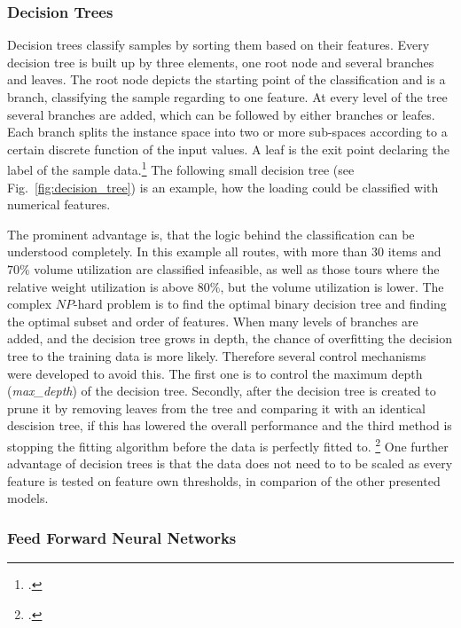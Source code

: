 \subsubsection{Decision Trees}
Decision trees classify samples by sorting them based on their features. Every decision tree
is built up by three elements, one root node and several branches and leaves. The root node
depicts the starting point of the classification and is a branch, classifying the sample
regarding to one feature. At every level of the tree several branches are added, which can be followed
by either branches or leafes. Each branch splits the instance space into two or more sub-spaces
according to a certain discrete function of the input values. A leaf is the exit point declaring
the label of the sample data.\footcite[cf.][p.5-6]{nasteski_overview_2017} The following small decision tree (see Fig.~\ref{fig:decision_tree}) is an example, how the loading could be classified with numerical features.


The  prominent advantage is, that the logic behind the classification can be understood
completely. In this example all routes, with more than 30 items and $70\%$ volume utilization are classified infeasible,
as well as those tours where the relative weight utilization is above $80\%$, but the volume utilization is lower. The complex
$NP$-hard problem is to find the optimal binary decision tree and finding the optimal subset and order of
features.
When many levels of branches are added, and the decision tree grows in depth, the chance of
overfitting the decision tree to the training data is more likely. Therefore several control mechanisms
were developed to avoid this. The first one is to control the maximum depth (\textit{max\_depth})
of the decision tree. Secondly, after the decision tree is created to prune it by removing leaves from
the tree and comparing it with an identical descision tree, if this has lowered the overall performance
and the third method is stopping the fitting algorithm before the data is perfectly fitted to. \footcite[cf.][p.252]{kotsiantis_supervised_2007}
One further advantage of decision trees is that the data does not need to to be scaled as every feature is
tested on feature own thresholds, in comparion of the other presented models.

\subsubsection{Feed Forward Neural Networks}

